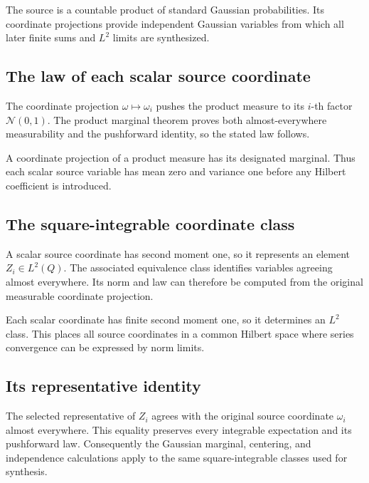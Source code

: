 \documentclass[11pt,a4paper]{report}
\begin{document}
The source is a countable product of standard Gaussian probabilities. Its coordinate projections provide independent Gaussian variables from which all later finite sums and \(L^2\) limits are synthesized.

\subsection{\texorpdfstring{The law of each scalar source coordinate}{The law of each scalar source coordinate}}
\label{report-step-UnadjustedLangevin-GaussianHilbert-lean-2}


The coordinate projection \(\omega\mapsto\omega_i\) pushes the product measure to its \(i\)-th factor \(\mathcal N(0,1)\). The product marginal theorem proves both almost-everywhere measurability and the pushforward identity, so the stated law follows.



A coordinate projection of a product measure has its designated marginal. Thus each scalar source variable has mean zero and variance one before any Hilbert coefficient is introduced.

\subsection{\texorpdfstring{The square-integrable coordinate class}{The square-integrable coordinate class}}
\label{report-step-UnadjustedLangevin-GaussianHilbert-lean-3}


A scalar source coordinate has second moment one, so it represents an element \(Z_i\in L^2(Q)\). The associated equivalence class identifies variables agreeing almost everywhere. Its norm and law can therefore be computed from the original measurable coordinate projection.



Each scalar coordinate has finite second moment one, so it determines an \(L^2\) class. This places all source coordinates in a common Hilbert space where series convergence can be expressed by norm limits.

\subsection{\texorpdfstring{Its representative identity}{Its representative identity}}
\label{report-step-UnadjustedLangevin-GaussianHilbert-lean-4}


The selected representative of \(Z_i\) agrees with the original source coordinate \(\omega_i\) almost everywhere. This equality preserves every integrable expectation and its pushforward law. Consequently the Gaussian marginal, centering, and independence calculations apply to the same square-integrable classes used for synthesis.
\end{document}
